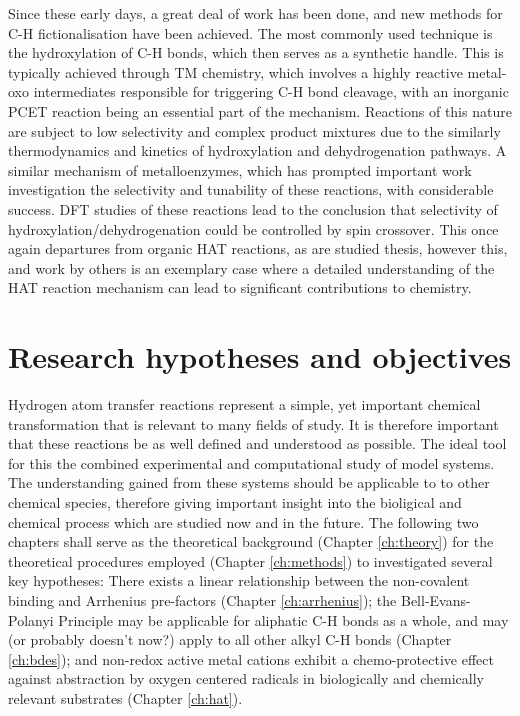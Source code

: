 Since these early days, a great deal of work has been done, and new methods for
C-H fictionalisation have been achieved. The most commonly used technique is the
hydroxylation of C-H bonds, which then serves as a synthetic handle. This is
typically achieved through TM chemistry, which involves a highly reactive
metal-oxo intermediates responsible for triggering C-H bond cleavage, with an
inorganic PCET reaction being an essential part of the
mechanism.\cite{Groves1976} Reactions of this nature are subject to low
selectivity and complex product mixtures due to the similarly thermodynamics and
kinetics of hydroxylation and dehydrogenation pathways.\cite{Balcells2016} A
similar mechanism of metalloenzymes, which has prompted important work
investigation the selectivity and tunability of these reactions, with
considerable success. DFT studies of these reactions lead to the conclusion that
selectivity of hydroxylation/dehydrogenation could be controlled by spin
crossover.\cite{Conde2013} This once again departures from organic HAT reactions,
as are studied thesis, however this, and work by others\cite{Miller2016} is an
exemplary case where a detailed understanding of the HAT reaction mechanism can
lead to significant contributions to chemistry.

\newpage
\section{Research hypotheses and objectives}
\label{sec:hypotheses}

Hydrogen atom transfer reactions represent a simple, yet important chemical
transformation that is relevant to many fields of study. It is therefore
important that these reactions be as well defined and understood as
possible. The ideal tool for this the combined experimental and computational
study of model systems. The understanding gained from these systems should be
applicable to to other chemical species, therefore giving important insight into
the bioligical and chemical process which are studied now and in the future. The
following two chapters shall serve as the theoretical background (Chapter
\ref{ch:theory}) for the theoretical procedures employed (Chapter
\ref{ch:methods}) to investigated several key hypotheses: There exists a linear
relationship between the non-covalent binding and Arrhenius pre-factors (Chapter
\ref{ch:arrhenius}); the Bell-Evans-Polanyi Principle may be applicable for
aliphatic C-H bonds as a whole, and may (or probably doesn't now?) apply to all
other alkyl C-H bonds (Chapter \ref{ch:bdes}); and non-redox active metal cations
exhibit a chemo-protective effect against abstraction by oxygen centered
radicals in biologically and chemically relevant substrates (Chapter
\ref{ch:hat}). 

